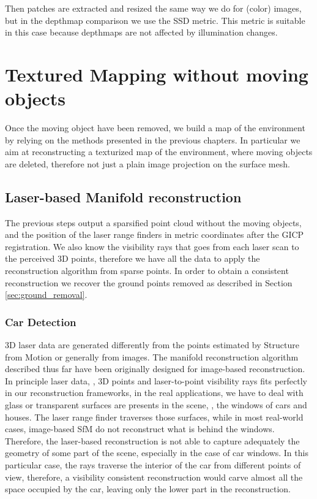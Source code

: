 Then patches are extracted and resized the same way we do for (color) images, but in the depthmap comparison we use the SSD metric. This metric is suitable in this case because depthmaps are not affected by illumination changes.



\section{Textured Mapping without moving objects}
Once the moving object have been removed, we build a map of the environment by relying on the methods presented in the previous chapters.
In particular we aim at reconstructing a texturized map of the environment, where moving objects are deleted, therefore not just a plain image projection on the surface mesh.
\subsection{Laser-based Manifold reconstruction}
The previous steps output a sparsified point cloud without the moving objects, and the position of the laser range finders in metric coordinates after the GICP registration.
We also know the visibility rays that goes from each laser scan to the perceived 3D points, therefore we have all the data to apply the reconstruction algorithm from sparse points.
In order to obtain a consistent reconstruction we recover the ground points removed as described in Section \ref{sec:ground_removal}.

\subsubsection{Car Detection}
3D laser data are generated differently from the points estimated by Structure from Motion or generally from images. 
The manifold reconstruction algorithm described thus far have been originally designed for image-based reconstruction.
In principle laser data, \ie, 3D points and laser-to-point visibility rays fits perfectly in our reconstruction frameworks, in the real applications, we have to deal with glass or transparent surfaces are presents in the scene, \eg, the windows of cars and houses. 
The laser range finder traverses those surfaces, while in most real-world cases, image-based SfM do not reconstruct what is behind the windows.
Therefore, the laser-based reconstruction is not able to capture adequately the geometry of some part of the scene, especially in the case of car windows. 
In this particular case, the rays traverse the interior of the car from different points of view, therefore, a visibility consistent reconstruction would carve almost all the space occupied by the car, leaving only the lower part in the reconstruction.



